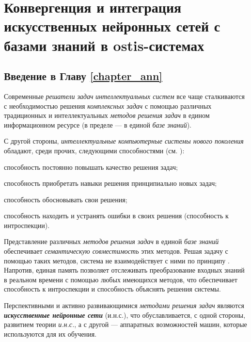 \chapter{Конвергенция и интеграция искусственных нейронных сетей с базами знаний в ostis-системах}
\label{chapter_ann}

\vspace{-7\baselineskip}

\section*{Введение в Главу \ref{chapter_ann}}

Современные \textit{решатели задач} \textit{интеллектуальных систем} все чаще сталкиваются с необходимостью решения \textit{комплексных задач} с помощью различных традиционных и интеллектуальных \textit{методов решения задач} в едином информационном ресурсе (в пределе --- в единой \textit{базе знаний}).

С другой стороны, \textit{интеллектуальные компьютерные системы нового поколения} обладают, среди прочих, следующими способностями (см. ):
\begin{textitemize}
	\item способность постоянно повышать качество решения задач;
	\item способность приобретать навыки решения принципиально новых задач;
	\item способность обосновывать свои решения;
	\item способность находить и устранять ошибки в своих решения (способность к интроспекции).
\end{textitemize}

Представление различных \textit{методов решения задач} в единой \textit{базе знаний} обеспечивает \textit{семантическую совместимость} этих методов. Решая задачу с помощью таких методов, система не взаимодействует с ними по принципу . Напротив, единая память позволяет отслеживать преобразование входных знаний в реальном времени с помощью любых имеющихся методов, что обеспечивает способность к интроспекции и способность объяснять решения системы.

Перспективными и активно развивающимися \textit{методами решения задач} являются \textbf{\textit{искусственные нейронные сети}} (и.н.с.), что обуславливается, с одной стороны, развитием теории \textit{и.н.с.}, а с другой --- аппаратных возможностей машин, которые используются для их обучения.

